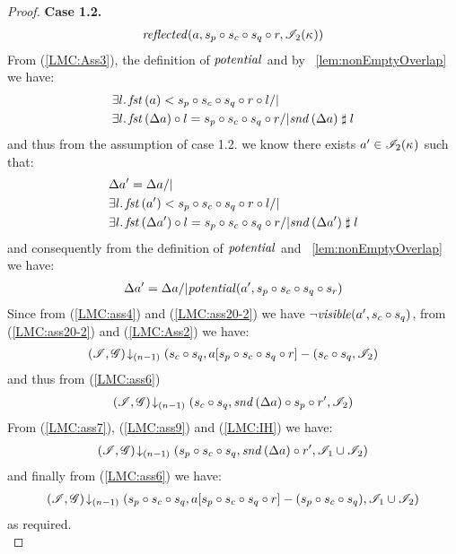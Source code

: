 \begin{lemma}
\begin{proof}
\noindent\textbf{Case 1.2.}
\[
\begin{array}{l l}
	\mathit{reflected}(a, s_p \circ s_c \circ s_q \circ r, \mathscr{I}_{2}(\kappa_{})) 
\end{array}
\]
From (\ref{LMC:Ass3}), the definition of $\mathit{potential}$ and by \lem~\ref{lem:nonEmptyOverlap} we have:
%
\begin{align*}
	& \exsts{l} \fst{a} < s_p \composeL s_c \composeL s_q \composeL r \composeL l /| \null\\
	& \exsts{l} \fst{\updateFP{a}} \composeL l = s_p \composeL s_c \composeL s_q \composeL r /| \snd{\updateFP{a}} \compatible l
\end{align*}
%
and thus from the assumption of case 1.2. we know there exists $a' \in \mathscr{I}_2(\kappa_{})$ such that: 
%
\begin{align*}
	& \updateFP{a'} = \updateFP{a} /|\\
	& \exsts{l} \fst{a'} < s_p \composeL s_c \composeL s_q \composeL r \composeL l /| \null\\
	& \exsts{l} \fst{\updateFP{a'}} \composeL l = s_p \composeL s_c \composeL s_q \composeL r /| \snd{\updateFP{a'}} \compatible l
\end{align*}
%
and consequently from the definition of $\mathit{potential}$ and \lem~\ref{lem:nonEmptyOverlap} we have: 
%
\begin{align}
	\Delta {a'} = \Delta {a} /| \mathit{potential}(a', s_p \circ s_c \circ s_q \circ s_r) \label{LMC:ass20-2}
\end{align}
Since from (\ref{LMC:ass4}) and (\ref{LMC:ass20-2}) we have $\neg\mathit{visible}(a', s_c \circ s_q)$, from (\ref{LMC:ass20-2}) and (\ref{LMC:Ass2}) we have:
%
\begin{align*}
	\left(\mathscr{I}, \mathscr{G}\right) \!\downarrow_{(n-1)} \left(s_c \circ s_q, a[s_p \circ s_c \circ s_q \circ r] - (s_c \circ s_q, \mathscr{I}_2\right)
\end{align*}
and thus from (\ref{LMC:ass6})
%
\begin{align}
	\left(\mathscr{I}, \mathscr{G}\right) \!\downarrow_{(n-1)} \left(s_c \circ s_q, \mathit{snd}\left(\Delta {a}\right) \circ s_p \circ r', \mathscr{I}_2\right) \label{LMC:ass9}
\end{align}
From (\ref{LMC:ass7}), (\ref{LMC:ass9}) and (\ref{LMC:IH}) we have: 
%
\begin{align*}
	\left(\mathscr{I}, \mathscr{G}\right) \!\downarrow_{(n-1)} \left(s_p \circ s_c \circ s_q, \mathit{snd}\left(\Delta {a}\right) \circ r', \mathscr{I}_1 \cup \mathscr{I}_2\right) 
\end{align*}
and finally from (\ref{LMC:ass6}) we have: 
%
\begin{align*}
	\left(\mathscr{I}, \mathscr{G}\right) \!\downarrow_{(n-1)} \left(s_p \circ s_c \circ s_q, a[s_p \circ s_c \circ s_q \circ r] - (s_p \circ s_c \circ s_q), \mathscr{I}_1 \cup \mathscr{I}_2\right) 
\end{align*}
as required.\\
%
%
%
%


\end{proof}
\end{lemma}

